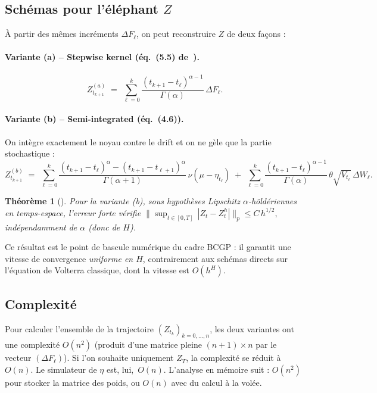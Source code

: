 \documentclass[11pt,a4paper]{article}
\newtheorem{theorem}{Théorème}[section]
\theoremstyle{definition}
\newcommand{\1}{\mathbf{1}}
\begin{document}
\subsection{Schémas pour l'éléphant $Z$}
À partir des mêmes incréments $\Delta F_\ell$, on peut reconstruire $Z$ de deux
façons :

\paragraph{Variante (a) -- Stepwise kernel (éq.~(5.5) de~\cite{BCGP23}).}
\begin{equation}
Z^{(a)}_{t_{k+1}} \;=\; \sum_{\ell=0}^{k} \frac{(t_{k+1}-t_\ell)^{\alpha-1}}{\Gamma(\alpha)}\, \Delta F_\ell.
\label{eq:scheme-a}
\end{equation}

\paragraph{Variante (b) -- Semi-integrated (éq.~(4.6)).}
On intègre exactement le noyau contre le drift et on ne gèle que la partie
stochastique :
\begin{equation}
Z^{(b)}_{t_{k+1}} \;=\; \sum_{\ell=0}^{k}
   \frac{(t_{k+1}-t_\ell)^{\alpha}-(t_{k+1}-t_{\ell+1})^{\alpha}}{\Gamma(\alpha+1)}\,
   \nu(\mu-\eta_{t_\ell})
   \;+\; \sum_{\ell=0}^{k} \frac{(t_{k+1}-t_\ell)^{\alpha-1}}{\Gamma(\alpha)}\,
   \theta\sqrt{V_{t_\ell}}\,\Delta W_\ell.
\label{eq:scheme-b}
\end{equation}

\begin{theorem}[{\cite[Thm~5.3]{BCGP23}}]
Pour la variante (b), sous hypothèses Lipschitz $\alpha$-höldériennes en temps-espace,
l'erreur forte vérifie
$\bigl\|\sup_{t\in[0,T]}\,|Z_t-Z^h_t|\bigr\|_p \leq C\, h^{1/2},$
\emph{indépendamment} de $\alpha$ (donc de $H$).
\end{theorem}

Ce résultat est le point de bascule numérique du cadre BCGP : il garantit une
vitesse de convergence \emph{uniforme en $H$}, contrairement aux schémas directs
sur l'équation de Volterra classique, dont la vitesse est $O(h^{H})$.

\subsection{Complexité}
Pour calculer l'ensemble de la trajectoire $(Z_{t_k})_{k=0,\dots,n}$, les deux
variantes ont une complexité $O(n^2)$ (produit d'une matrice pleine $(n+1)\times n$
par le vecteur $(\Delta F_\ell)$). Si l'on souhaite uniquement $Z_T$, la
complexité se réduit à $O(n)$. Le simulateur de $\eta$ est, lui,~$O(n)$.
L'analyse en mémoire suit : $O(n^2)$ pour stocker la matrice des poids, ou
$O(n)$ avec du calcul à la volée.
\end{document}
